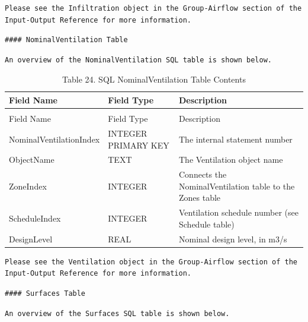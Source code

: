\begin{lstlisting}
Please see the Infiltration object in the Group-Airflow section of the Input-Output Reference for more information.
\end{lstlisting}

\begin{lstlisting}
#### NominalVentilation Table
\end{lstlisting}

\begin{lstlisting}
An overview of the NominalVentilation SQL table is shown below.
\end{lstlisting}

\begin{longtable}[c]{p{1.5in}p{1.5in}p{3.0in}}
\caption{Table 24. SQL NominalVentilation Table Contents \label{table:table-24.-sql-nominalventilation-table}} \tabularnewline
\toprule 
Field Name & Field Type & Description \tabularnewline
\midrule
\endfirsthead

\caption[]{Table 24. SQL NominalVentilation Table Contents} \tabularnewline
\toprule 
Field Name & Field Type & Description \tabularnewline
\midrule
\endhead

NominalVentilationIndex & INTEGER PRIMARY KEY & The internal statement number \tabularnewline
ObjectName & TEXT & The Ventilation object name \tabularnewline
ZoneIndex & INTEGER & Connects the NominalVentilation table to the Zones table \tabularnewline
ScheduleIndex & INTEGER & Ventilation schedule number (see Schedule table) \tabularnewline
DesignLevel & REAL & Nominal design level, in m3/s \tabularnewline
\bottomrule
\end{longtable}

\begin{lstlisting}
Please see the Ventilation object in the Group-Airflow section of the Input-Output Reference for more information.
\end{lstlisting}

\begin{lstlisting}
#### Surfaces Table
\end{lstlisting}

\begin{lstlisting}
An overview of the Surfaces SQL table is shown below.
\end{lstlisting}

